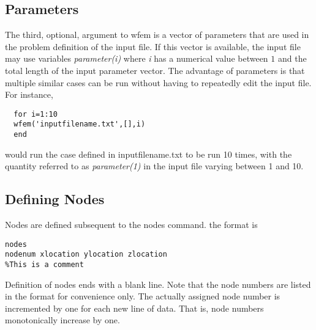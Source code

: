 \documentclass[12pt]{article}
\newcommand*{\command}[1]{\textsf{#1}}
\newcommand*{\variable}[1]{\textit{#1}}
\begin{document}
\subsection{Parameters}
The third, optional, argument to \command{wfem} is a vector of parameters that are used in the problem definition of the input file. If this vector is available, the input file may use variables \variable{parameter(i)} where \variable{i} has a numerical value between $1$ and the total length of the input parameter vector. The advantage of parameters is that multiple similar cases can be run without having to repeatedly edit the input file. For instance,
\begin{lstlisting}
  for i=1:10
  wfem('inputfilename.txt',[],i)
  end
\end{lstlisting}
would run the case defined in \textsf{inputfilename.txt} to be run 10 times, with the quantity referred to as \variable{parameter(1)} in the input file varying between 1 and 10.

\subsection{Defining Nodes}
\label{command:nodes}
Nodes are defined subsequent to the \command{nodes} command. the format is
\begin{lstlisting}
nodes
nodenum xlocation ylocation zlocation
%This is a comment
\end{lstlisting}
Definition of nodes ends with a blank line. Note that the node numbers are listed in the format for convenience only. The actually assigned node number is incremented by one for each new line of data. That is, node numbers monotonically increase by one.
\end{document}
